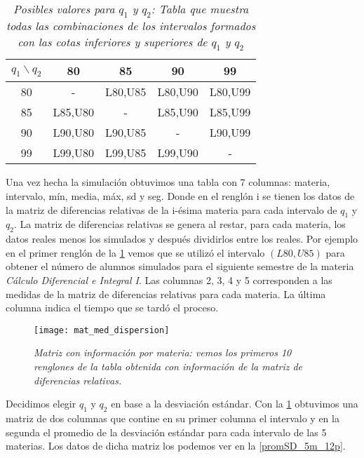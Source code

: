 \begin{table}[H]
\centering
\begin{tabular}{|c|c|c|c|c|}
\hline 
$q_{1} \backslash q_{2}$ & 80 & 85 & 90 & 99 \\ 
\hline 
80 & - & L80,U85 & L80,U90 & L80,U99 \\ 
\hline 
85 & L85,U80 & - & L85,U90 & L85,U99 \\ 
\hline 
90 & L90,U80 & L90,U85 & - & L90,U99 \\ 
\hline 
99 & L99,U80 & L99,U85 & L99,U90 & - \\ 
\hline 
\end{tabular} 
\caption[\textit{Posibles valores para $q_{1}$ y $q_{2}$}]{\textit{Posibles valores para $q_{1}$ y $q_{2}$: Tabla que muestra todas las combinaciones de los intervalos formados con las cotas inferiores y superiores de $q_{1}$ y $q_{2}$}}\label{valoresQ1Q2}
\end{table}


Una vez hecha la simulación obtuvimos una tabla con 7 columnas: materia, intervalo, mín, media, máx, sd y seg. Donde en el renglón i se tienen los datos de la matriz de diferencias relativas de la i-ésima materia para cada intervalo de $q_{1}$ y $q_{2}$. La matriz de diferencias relativas se genera al restar, para cada materia, los datos reales menos los simulados y después dividirlos entre los reales. Por ejemplo en el primer renglón de la \figurename{\ref{matMedDispersion}} vemos que se utilizó el intervalo $(L80,U85)$ para obtener el número de alumnos simulados para el siguiente semestre de la materia \textit{Cálculo Diferencial e Integral I}. Las columnas 2, 3, 4 y 5 corresponden a las medidas de la matriz de diferencias relativas para cada materia. La última columna indica el tiempo que se tardó el proceso.

\begin{figure}[H]
\centering
\texttt{[image: mat\_med\_dispersion]} %
\caption[\textit{Matriz con información por materia}]{\textit{Matriz con información por materia: vemos los primeros 10 renglones de la tabla obtenida con información de la matriz de diferencias relativas.}}\label{matMedDispersion}
\end{figure}


Decidimos elegir $q_{1}$ y $q_{2}$ en base a la desviación estándar. Con la \figurename{\ref{matMedDispersion}} obtuvimos una matriz de dos columnas que contine en su primer columna el intervalo y en la segunda el promedio de la desviación estándar para cada intervalo de las 5 materias. Los datos de dicha matriz los podemos ver en la \figurename{\ref{promSD_5m_12p}}.


